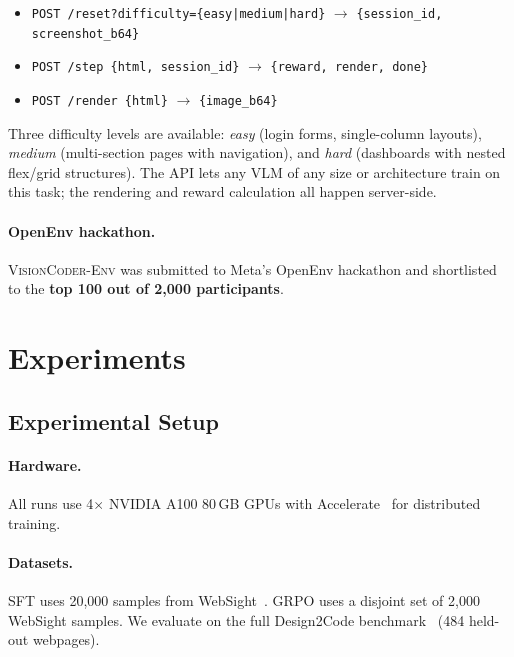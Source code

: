 \documentclass[10pt,twocolumn,letterpaper]{article}
\newcommand{\model}[1]{\textsc{#1}}
\newcommand{\env}[1]{\texttt{#1}}
\begin{document}
\begin{itemize}[leftmargin=1.2em,itemsep=1pt,topsep=2pt]
  \item \env{POST /reset?difficulty=\{easy|medium|hard\}} $\to$
        \env{\{session\_id, screenshot\_b64\}}
  \item \env{POST /step \{html, session\_id\}} $\to$
        \env{\{reward, render, done\}}
  \item \env{POST /render \{html\}} $\to$ \env{\{image\_b64\}}
\end{itemize}

Three difficulty levels are available: \textit{easy} (login forms, single-column
layouts), \textit{medium} (multi-section pages with navigation), and
\textit{hard} (dashboards with nested flex/grid structures).  The API lets any
VLM of any size or architecture train on this task; the rendering and reward
calculation all happen server-side.

\paragraph{OpenEnv hackathon.}
\model{VisionCoder-Env} was submitted to Meta's OpenEnv hackathon and
shortlisted to the \textbf{top 100 out of 2{,}000 participants}.

\section{Experiments}

\subsection{Experimental Setup}

\paragraph{Hardware.} All runs use 4$\times$ NVIDIA A100 80\,GB GPUs with
Accelerate~\citep{gugger2022accelerate} for distributed training.

\paragraph{Datasets.}
SFT uses 20{,}000 samples from WebSight~\citep{huggingface2024websight}.
GRPO uses a disjoint set of 2{,}000 WebSight samples.  We evaluate on the
full Design2Code benchmark~\citep{si2025design2code} (484 held-out webpages).
\end{document}
